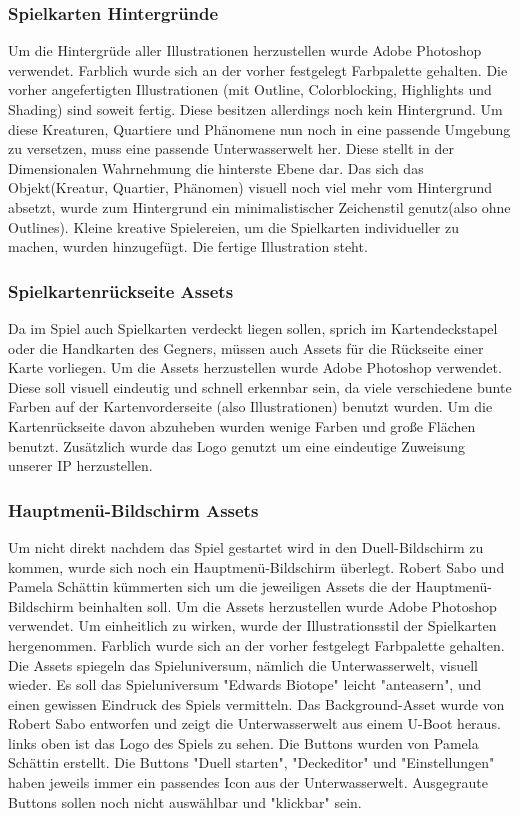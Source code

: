 \subsubsection{Spielkarten Hintergründe}
Um die Hintergrüde aller Illustrationen herzustellen wurde Adobe Photoshop verwendet. Farblich wurde sich an der vorher festgelegt Farbpalette gehalten. Die vorher angefertigten Illustrationen (mit Outline, Colorblocking, Highlights und Shading) sind soweit fertig. Diese besitzen allerdings noch kein Hintergrund. Um diese Kreaturen, Quartiere und Phänomene nun noch in eine passende Umgebung zu versetzen, muss eine passende Unterwasserwelt her. Diese stellt in der Dimensionalen Wahrnehmung die hinterste Ebene dar. Das sich das Objekt(Kreatur, Quartier, Phänomen) visuell noch viel mehr vom Hintergrund absetzt, wurde zum Hintergrund ein minimalistischer Zeichenstil genutz(also ohne Outlines). Kleine kreative Spielereien, um die Spielkarten individueller zu machen, wurden hinzugefügt. Die fertige Illustration steht.

\subsubsection{Spielkartenrückseite Assets}
Da im Spiel auch Spielkarten verdeckt liegen sollen, sprich im Kartendeckstapel oder die Handkarten des Gegners, müssen auch Assets für die Rückseite einer Karte vorliegen. Um die Assets herzustellen wurde Adobe Photoshop verwendet. Diese soll visuell eindeutig und schnell erkennbar sein, da viele verschiedene bunte Farben auf der Kartenvorderseite (also Illustrationen) benutzt wurden. Um die Kartenrückseite davon abzuheben wurden wenige Farben und große Flächen benutzt. Zusätzlich wurde das Logo genutzt um eine eindeutige Zuweisung unserer IP herzustellen.

\subsubsection{Hauptmenü-Bildschirm Assets}
Um nicht direkt nachdem das Spiel gestartet wird in den Duell-Bildschirm zu kommen, wurde sich noch ein Hauptmenü-Bildschirm überlegt. Robert Sabo und Pamela Schättin kümmerten sich um die jeweiligen Assets die der Hauptmenü-Bildschirm beinhalten soll. Um die Assets herzustellen wurde Adobe Photoshop verwendet. Um einheitlich zu wirken, wurde der Illustrationsstil der Spielkarten hergenommen. Farblich wurde sich an der vorher festgelegt Farbpalette gehalten. Die Assets spiegeln das Spieluniversum, nämlich die Unterwasserwelt, visuell wieder. Es soll das Spieluniversum "Edwards Biotope" leicht "anteasern", und einen gewissen Eindruck des Spiels vermitteln. Das Background-Asset wurde von Robert Sabo entworfen und zeigt die Unterwasserwelt aus einem U-Boot heraus. links oben ist das Logo des Spiels zu sehen. Die Buttons wurden von Pamela Schättin erstellt. Die Buttons "Duell starten", "Deckeditor" und "Einstellungen" haben jeweils immer ein passendes Icon aus der Unterwasserwelt. Ausgegraute Buttons sollen noch nicht auswählbar und "klickbar" sein.

